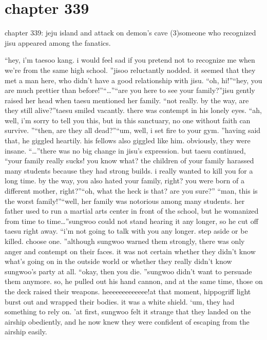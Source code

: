 \section{chapter 339}

chapter 339: jeju island and attack on demon’s cave (3)someone who recognized jisu appeared among the fanatics.





“hey, i’m taesoo kang.
 i would feel sad if you pretend not to recognize me when we’re from the same high school.
”jisoo reluctantly nodded.
 it seemed that they met a man here, who didn’t have a good relationship with jisu.
“oh, hi!”“hey, you are much prettier than before!”“…”“are you here to see your family?”jisu gently raised her head when taesu mentioned her family.
“not really.
 by the way, are they still alive?”taesu smiled vacantly.
 there was contempt in his lonely eyes.
“ah, well, i’m sorry to tell you this, but in this sanctuary, no one without faith can survive.
”“then, are they all dead?”“um, well, i set fire to your gym.
”having said that, he giggled heartily.
 his fellows also giggled like him.
obviously, they were insane.
“…”there was no big change in jisu’s expression.
but taesu continued, “your family really sucks! you know what? the children of your family harassed many students because they had strong builds.
 i really wanted to kill you for a long time.
 by the way, you also hated your family, right? you were born of a different mother, right?”“oh, what the heck is that? are you sure?”
“man, this is the worst family!”“well, her family was notorious among many students.
 her father used to run a martial arts center in front of the school, but he womanized from time to time…”sungwoo could not stand hearing it any longer, so he cut off taesu right away.
“i’m not going to talk with you any longer.
 step aside or be killed.
 choose one.
”although sungwoo warned them strongly, there was only anger and contempt on their faces.
it was not certain whether they didn’t know what’s going on in the outside world or whether they really didn’t know sungwoo’s party at all.
“okay, then you die.
”sungwoo didn’t want to persuade them anymore.
 so, he pulled out his hand cannon, and at the same time, those on the deck raised their weapons.
heeeeeeeeeeeee!at that moment, hippogriff light burst out and wrapped their bodies.
 it was a white shield.
‘um, they had something to rely on.
’at first, sungwoo felt it strange that they landed on the airship obediently, and he now knew they were confident of escaping from the airship easily.
